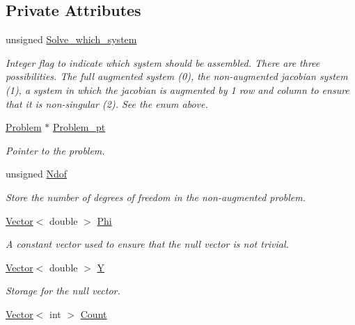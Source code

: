 \subsection*{Private Attributes}
\begin{DoxyCompactItemize}
\item 
unsigned \hyperlink{classoomph_1_1FoldHandler_a76ecb78ebc1d48e5511b70660953f02d}{Solve\+\_\+which\+\_\+system}
\begin{DoxyCompactList}\small\item\em Integer flag to indicate which system should be assembled. There are three possibilities. The full augmented system (0), the non-\/augmented jacobian system (1), a system in which the jacobian is augmented by 1 row and column to ensure that it is non-\/singular (2). See the enum above. \end{DoxyCompactList}\item 
\hyperlink{classoomph_1_1Problem}{Problem} $\ast$ \hyperlink{classoomph_1_1FoldHandler_a2bd14323ca059b1aaef045cb9cc4013b}{Problem\+\_\+pt}
\begin{DoxyCompactList}\small\item\em Pointer to the problem. \end{DoxyCompactList}\item 
unsigned \hyperlink{classoomph_1_1FoldHandler_aa3f143846245ecea5967ba7c79bedf56}{Ndof}
\begin{DoxyCompactList}\small\item\em Store the number of degrees of freedom in the non-\/augmented problem. \end{DoxyCompactList}\item 
\hyperlink{classoomph_1_1Vector}{Vector}$<$ double $>$ \hyperlink{classoomph_1_1FoldHandler_a7b6ebf95bb87aab0c3df7daf841af3a8}{Phi}
\begin{DoxyCompactList}\small\item\em A constant vector used to ensure that the null vector is not trivial. \end{DoxyCompactList}\item 
\hyperlink{classoomph_1_1Vector}{Vector}$<$ double $>$ \hyperlink{classoomph_1_1FoldHandler_ac8697e5d9484fc0488d4c16b822c792e}{Y}
\begin{DoxyCompactList}\small\item\em Storage for the null vector. \end{DoxyCompactList}\item 
\hyperlink{classoomph_1_1Vector}{Vector}$<$ int $>$ \hyperlink{classoomph_1_1FoldHandler_a302fed88ed8dad865616a3d050d385ad}{Count}

\end{DoxyCompactItemize}
